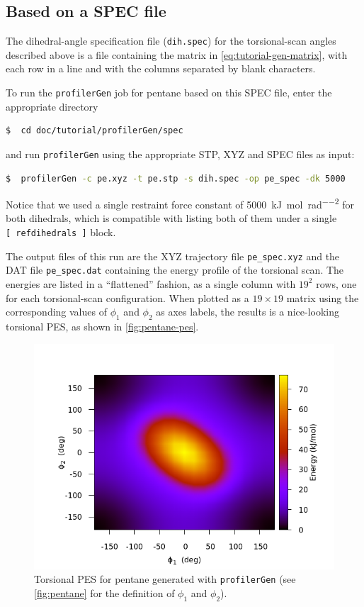 \documentclass[10pt,a4paper,openany]{memoir}
\numberwithin{equation}{section}
\newcommand{\profilergen}[0]{\texttt{profilerGen}}
\begin{document}
\noindent

\subsection{Based on a SPEC file}
\label{sec:tutorial-profilergen-spec}

The dihedral-angle specification file (\texttt{dih.spec}) for the
torsional-scan angles described above is a file containing the matrix
in \autoref{eq:tutorial-gen-matrix}, with each row in a line and with
the columns separated by blank characters.

To run the \profilergen{} job for pentane based on this SPEC file,
enter the appropriate directory

\begin{lstlisting}[language=bash]
$  cd doc/tutorial/profilerGen/spec
\end{lstlisting}\vspace{2ex}\par

\noindent
and run \profilergen{} using the appropriate STP, XYZ and SPEC files as input:

\begin{lstlisting}[language=bash]
$  profilerGen -c pe.xyz -t pe.stp -s dih.spec -op pe_spec -dk 5000
\end{lstlisting}\vspace{2ex}\par

\noindent
Notice that we used a single restraint force constant of
\SI{5000}{\kJ\per\mole\per\radian\squared} for both dihedrals, which
is compatible with listing both of them
under a single \texttt{[~refdihedrals~]} block.

The output files of this run are the XYZ trajectory file
\texttt{pe\_spec.xyz} and the DAT file \texttt{pe\_spec.dat}
containing the energy profile of the torsional scan. The energies are
listed in a ``flattened'' fashion, as a single column with $19^2$
rows, one for each torsional-scan configuration. When plotted as a
$19\times 19$ matrix using the corresponding values of $\phi_1$ and
$\phi_2$ as axes labels, the results is a nice-looking torsional PES,
as shown in \autoref{fig:pentane-pes}.

\begin{figure}[tb]
  \centering
  \includegraphics[width=.6\textwidth]{pe_spec}
  \caption{Torsional PES for pentane generated with \profilergen{}
    (see \autoref{fig:pentane} for the definition of $\phi_1$ and
    $\phi_2$).}
  \label{fig:pentane-pes}
\end{figure}
\end{document}

